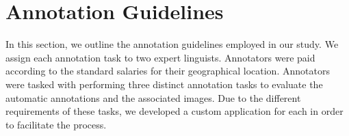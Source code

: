 \documentclass[11pt]{article}
\newcommand{\resource}{Concept-pedia}
\begin{document}

\section{Annotation Guidelines}
\label{sec:appendix-guide}
In this section, we outline the annotation guidelines employed in our study. 
We assign each annotation task to two expert linguists.
Annotators were paid according to the standard salaries for their geographical location.
Annotators were tasked with performing three distinct annotation tasks to evaluate the automatic annotations and the associated images. Due to the different requirements of these tasks, we developed a custom application for each in order to facilitate the process.
\end{document}
